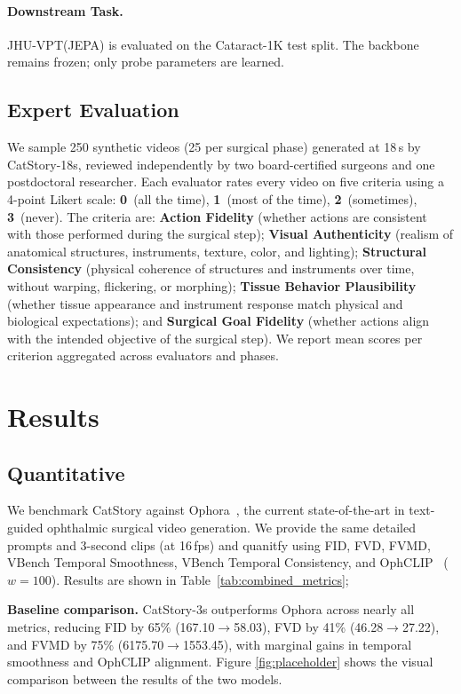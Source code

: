 \documentclass[runningheads]{llncs}
\begin{document}
\paragraph{Downstream Task.}
JHU-VPT(JEPA) is evaluated on the Cataract-1K \cite{Cataract-1K} test split. The backbone remains frozen; only probe parameters are learned.

\subsection{Expert Evaluation}
We sample 250 synthetic videos (25 per surgical phase) generated at 18\,s by CatStory-18s, reviewed independently by two board-certified surgeons and one postdoctoral researcher. Each evaluator rates every video on five criteria using a 4-point Likert scale: \textbf{0}~(all the time), \textbf{1}~(most of the time), \textbf{2}~(sometimes), \textbf{3}~(never). The criteria are: \textbf{Action Fidelity} (whether actions are consistent with those performed during the surgical step); \textbf{Visual Authenticity} (realism of anatomical structures, instruments, texture, color, and lighting); \textbf{Structural Consistency} (physical coherence of structures and instruments over time, without warping, flickering, or morphing); \textbf{Tissue Behavior Plausibility} (whether tissue appearance and instrument response match physical and biological expectations); and \textbf{Surgical Goal Fidelity} (whether actions align with the intended objective of the surgical step). We report mean scores per criterion aggregated across evaluators and phases.

\section{Results}

\subsection{Quantitative}
We benchmark CatStory against Ophora~\cite{ophora}, the current state-of-the-art in text-guided ophthalmic surgical video generation. We provide the same detailed prompts and 3-second clips (at 16\,fps) and quanitfy using FID, FVD, FVMD, VBench Temporal Smoothness, VBench Temporal Consistency, and OphCLIP~\cite{hu2024ophcliphierarchicalretrievalaugmentedlearning} ($w{=}100$). Results are shown in Table~\ref{tab:combined_metrics}; 

\noindent\textbf{Baseline comparison.} CatStory-3s outperforms Ophora across nearly all metrics, reducing FID by 65\% (167.10$\to$58.03), FVD by 41\% (46.28$\to$27.22), and FVMD by 75\% (6175.70$\to$1553.45), with marginal gains in temporal smoothness and OphCLIP alignment. Figure \ref{fig:placeholder} shows the visual comparison between the results of the two models.
\end{document}

